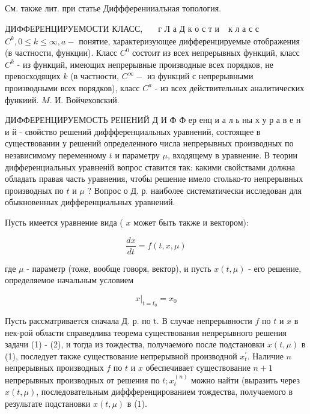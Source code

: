 \documentclass[10pt]{article}
\begin{document}
См. также лит. при статье Диффференииалъная топология.



ДИФФЕРЕНЦИРУЕМОСТИ КЛАСС, $\begin{aligned} & \text { г Л а Д к о с т и }\end{aligned}$ к л а с с $C^{k}, 0 \leqslant k \leqslant \infty, a-$ понятие, характеризующее дифференцируемые отображения (в частности, функции). Класс $C^{0}$ состоит из всех непрерывных функций, класс $C^{k}$ - из функций, имеющих непрерывные производные всех порядков, не превосходящих $k$ (в частности, $C^{\infty}-$ из функций с непрерывными производными всех порядков), класс $C^{a}$ - из всех действительных аналитических функиий. $M$. И. Войчеховский.



ДИФФЕРЕНЦИРУЕМОСТЬ РЕІІЕНИЙ Д И Ф Ф ер енц и а л ь ны х у р а в е н и й - свойство решений диффференциальных уравнений, состоящее в существовании у решений определенного числа непрерывных производных по независимому переменному $t$ и параметру $\mu$, входящему в уравнение. В теории дифференциальных уравненій вопрос ставится так: какими свойствами должна обладать правая часть уравнения, чтобы решение имело столько-то непрерывных производных по $t$ и $\mu$ ? Вопрос о Д. р. наиболее систематически исследован для обыкновенных дифференциальных уравнений.



Пусть имеется уравнение вида ( $x$ может быть также и вектором):



\[

\frac{d x}{d t}=f(t, x, \mu)

\]



где $\mu$ - параметр (тоже, вообще говоря, вектор), и пусть $x(t, \mu)$ - его решение, определяемое начальным условием



\[

\left.x\right|_{t=t_{0}}=x_{0}

\]



Пусть рассматривается сначала Д. р. по t. В случае непрерывности $f$ по $t$ и $x$ в нек-рой области справедлива теорема существования непрерывного решения задачи (1) - (2), и тогда из тождества, получаемого после подстановки $x(t, \mu)$ в (1), последует также существование непрерывной производной $x_{t}^{\prime}$. Наличие $n$ непрерывных производных $f$ по $t$ и $x$ обеспечивает существование $n+1$ непрерывных производных от решения по $t ; x_{t}^{(n)}$ можно найти (выразить через $x(t, \mu)$, последовательным диффференцированием тождества, получаемого в результате подстановки $x(t, \mu)$ в (1).
\end{document}
